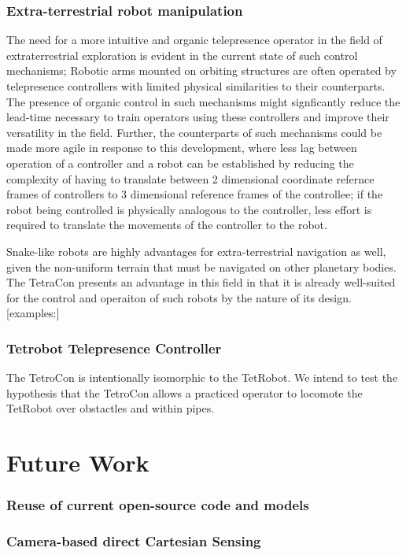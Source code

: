 \documentclass[11pt]{article}
\begin{document}
\subsubsection{Extra-terrestrial robot manipulation}

The need for a more intuitive and organic telepresence operator in the field of extraterrestrial exploration is evident in the current state of such control mechanisms; Robotic arms mounted on orbiting structures are often operated by telepresence controllers with limited physical similarities to their counterparts. The presence of organic control in such mechanisms might signficantly reduce the lead-time necessary to train operators using these controllers and improve their versatility in the field. Further, the counterparts of such mechanisms could be made more agile in response to this development, where less lag between operation of a controller and a robot can be established by reducing the complexity of having to translate between 2 dimensional coordinate refernce frames of controllers to 3 dimensional reference frames of the controllee; if the robot being controlled is physically analogous to the controller, less effort is required to translate the movements of the controller to the robot.

Snake-like robots are highly advantages for extra-terrestrial navigation as well, given the non-uniform terrain that must be navigated on other planetary bodies. The TetraCon presents an advantage in this field in that it is already well-suited for the control and operaiton of such robots by the nature of its design. [examples:]
\subsubsection{Tetrobot Telepresence Controller}

 The TetroCon is intentionally isomorphic to the TetRobot. We intend to test the hypothesis that the TetroCon allows a practiced operator to locomote the TetRobot over obstactles and within pipes.

 \section{Future Work}

 
\subsubsection{Reuse of current open-source code and models}
\subsubsection{Camera-based direct Cartesian Sensing}
\end{document}
